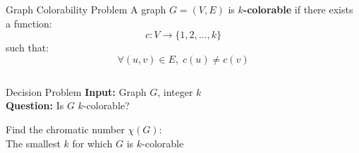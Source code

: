 \documentclass{beamer}
\begin{document}
\begin{frame}{Graph Colorability Problem}
    \textbf{\color{myred}{Definition}}
        A graph $G=(V,E)$ is \textbf{$k$-colorable} if there exists a function:
        \[
        c : V \rightarrow \{1,2,\dots,k\}
        \]
        such that:
        \[
        \forall (u,v) \in E,\; c(u) \neq c(v)
        \]
    
    \begin{columns}[T]
        \begin{column}{0.5\textwidth}
            \begin{alertblock}{Decision Problem}
                \textbf{Input:} Graph $G$, integer $k$ \\
                \textbf{Question:} Is $G$ $k$-colorable?
            \end{alertblock}
            
            \textbf{\color{myred}{Optimization Version}}
                Find the \textcolor{myred}{chromatic number} $\chi(G)$: \\
                The smallest $k$ for which $G$ is $k$-colorable
        \end{column}
        
        \begin{column}{0.5\textwidth}
            \begin{center}
            \end{center}
        \end{column}
    \end{columns}
\end{frame}
\end{document}
